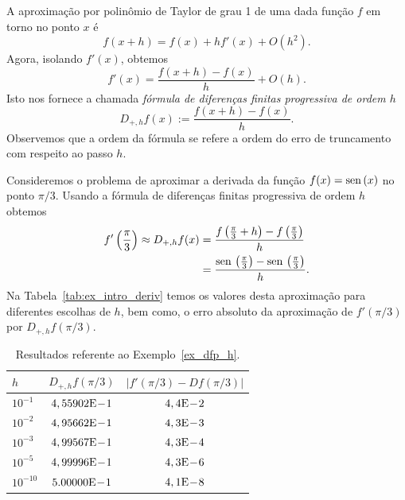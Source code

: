 A aproximação por polinômio de Taylor de grau 1 de uma dada função $f$ em torno no ponto $x$ é
\begin{equation}
  f(x+h) = f(x) + hf'(x) + O(h^2).
\end{equation}
Agora, isolando $f'(x)$, obtemos
\begin{equation}
  f'(x) = \frac{f(x+h) - f(x)}{h} + O(h).
\end{equation}
Isto nos fornece a chamada \emph{fórmula de diferenças finitas progressiva de ordem $h$}
\begin{equation}
  D_{+,h}f(x) := \frac{f(x+h) - f(x)}{h}.
\end{equation}
Observemos que a ordem da fórmula se refere a ordem do erro de truncamento com respeito ao passo $h$.

\begin{ex}\label{ex_dfp_h}
  Consideremos o problema de aproximar a derivada da função $f(x) = \operatorname{sen}\,(x)$ no ponto $\pi/3$. Usando a fórmula de diferenças finitas progressiva de ordem $h$ obtemos
  \begin{align}
    f'\left(\frac{\pi}{3}\right) \approx D_{+,h}f(x) &= \frac{f\left(\frac{\pi}{3}+h\right)-f\left(\frac{\pi}{3}\right)}{h}\\
          &= \frac{\operatorname{sen}\,\left(\frac{\pi}{3}\right)-\operatorname{sen}\,\left(\frac{\pi}{3}\right)}{h}. 
  \end{align}
Na Tabela~\ref{tab:ex_intro_deriv} temos os valores desta aproximação para diferentes escolhas de $h$, bem como, o erro absoluto da aproximação de $f'(\pi/3)$ por $D_{+,h}f(\pi/3)$.

\begin{table}[h]
  \centering
  \begin{tabular}{l|c|c}
    $h$ & $D_{+,h}f(\pi/3)$ & $|f'(\pi/3)-Df(\pi/3)|$\\ \hline
    $10^{-1}$ & $4,55902\mathrm{E}\!-\!1$ & $4,4\mathrm{E}\!-\!2$ \\
    $10^{-2}$ & $4,95662\mathrm{E}\!-\!1$ & $4,3\mathrm{E}\!-\!3$ \\
    $10^{-3}$ & $4,99567\mathrm{E}\!-\!1$ & $4,3\mathrm{E}\!-\!4$ \\
    $10^{-5}$ & $4,99996\mathrm{E}\!-\!1$ & $4,3\mathrm{E}\!-\!6$ \\
    $10^{-10}$ & $5.00000\mathrm{E}\!-\!1$ & $4,1\mathrm{E}\!-\!8$ \\\hline
  \end{tabular}
  \caption{Resultados referente ao Exemplo~\ref{ex_dfp_h}.}
  \label{tab:ex_dfp_h}
\end{table}
\end{ex}

